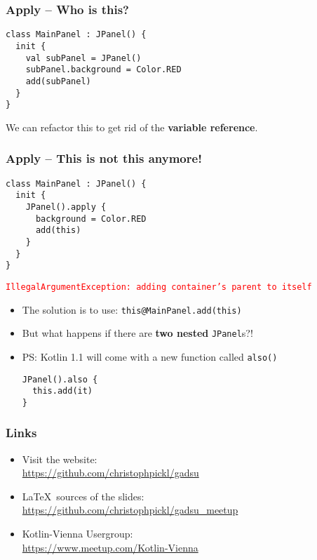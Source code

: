 \begin{frame}[fragile] \frametitle{Apply -- Who is this?}
\begin{lstlisting}
class MainPanel : JPanel() {
  init {
    val subPanel = JPanel()
    subPanel.background = Color.RED
    add(subPanel)
  }
}
\end{lstlisting}
\pause
We can refactor this to get rid of the \textbf{variable reference}.
\end{frame}


\begin{frame}[fragile] \frametitle{Apply -- This is not this anymore!}
\begin{lstlisting}
class MainPanel : JPanel() {
  init {
    JPanel().apply {
      background = Color.RED
      add(this)
    }
  }
}
\end{lstlisting}
\pause
\footnotesize{\texttt{\textcolor{red}{IllegalArgumentException: adding container's parent to itself}}}
\pause
\begin{itemize}
	\item The solution is to use: \texttt{this\textcolor{someBlue}{@MainPanel}.add(this)}
	\item But what happens if there are \textbf{two nested} \texttt{JPanel}s?!
	\item PS: Kotlin 1.1 will come with a new function called \texttt{also()}
\begin{lstlisting}
JPanel().also {
  this.add(it)
}
\end{lstlisting}

\end{itemize}
\end{frame}


\begin{frame}\frametitle{Links}

\begin{itemize}
	\item Visit the website: \\ \href{https://github.com/christophpickl/gadsu}{https://github.com/christophpickl/gadsu}
	\item \LaTeX~sources of the slides: \\ \href{https://github.com/christophpickl/gadsu_meetup}{https://github.com/christophpickl/gadsu\_meetup}
	\item Kotlin-Vienna Usergroup: \\ \href{https://www.meetup.com/Kotlin-Vienna}{https://www.meetup.com/Kotlin-Vienna}
	
\end{itemize}

\end{frame}



